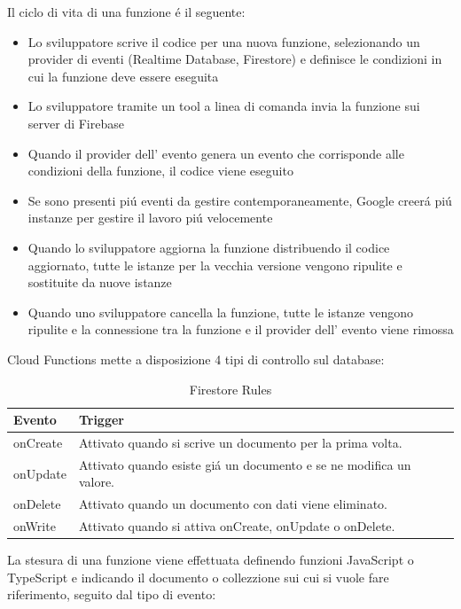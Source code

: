 Il ciclo di vita di una funzione \'e il seguente:
\begin{itemize}
  \item Lo sviluppatore scrive il codice per una nuova funzione, selezionando un provider di eventi (Realtime Database, Firestore) e definisce le condizioni in cui la funzione deve essere eseguita
  \item Lo sviluppatore tramite un tool a linea di comanda invia la funzione sui server di Firebase
  \item Quando il provider dell' evento genera un evento che corrisponde alle condizioni della funzione, il codice viene eseguito
  \item Se sono presenti pi\'u eventi da gestire contemporaneamente, Google creer\'a pi\'u instanze per gestire il lavoro pi\'u velocemente
  \item Quando lo sviluppatore aggiorna la funzione distribuendo il codice aggiornato, tutte le istanze per la vecchia versione vengono ripulite e sostituite da nuove istanze
  \item Quando uno sviluppatore cancella la funzione, tutte le istanze vengono ripulite e la connessione tra la funzione e il provider dell' evento viene rimossa
\end{itemize}


\newpage              %
Cloud Functions mette a disposizione 4 tipi di controllo sul database:

\begin{table}[h!]
\begin{tabular}{|p{2cm}|p{12cm}|}
    \hline
    \textbf{Evento} & \textbf{Trigger} \\ \hline
    onCreate &  Attivato quando si scrive un documento per la prima volta.\\ \hline
    onUpdate &  Attivato quando esiste gi\'a un documento e se ne modifica un valore.\\ \hline
    onDelete &  Attivato quando un documento con dati viene eliminato.\\ \hline
    onWrite & Attivato quando si attiva onCreate, onUpdate o onDelete.\\ \hline

\end{tabular}
\caption[Firestore Rules]{Firestore Rules}\label{tab:Firestore Rules}
\end{table}


La stesura di una funzione viene effettuata definendo funzioni JavaScript o TypeScript e indicando il documento o collezzione sui cui si vuole fare riferimento, seguito dal tipo di evento:



